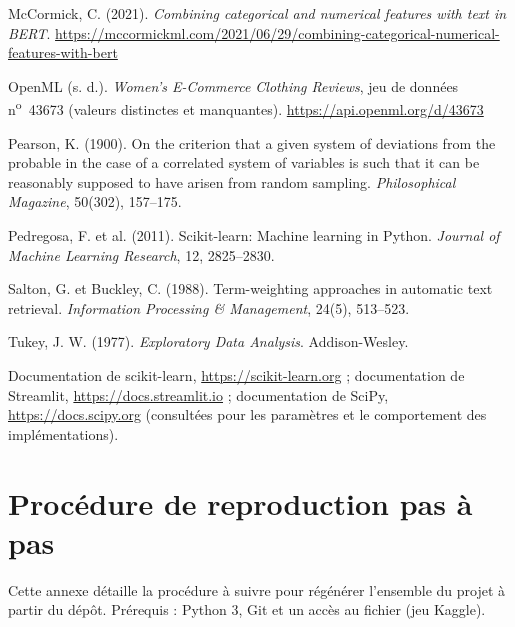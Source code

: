 \documentclass[11pt,a4paper]{report}
\makeatletter
\numberwithin{equation}{chapter}
\DeclareRobustCommand{\code}[1]{{\ttfamily\fontsize{\strip@pt\dimexpr\f@size pt*9/10\relax}{\f@baselineskip}\selectfont\detokenize{#1}}}
\makeatother
\begin{document}
\begin{list}{}{\setlength{\leftmargin}{1.5em}\setlength{\itemindent}{-1.5em}\setlength{\itemsep}{4pt}\setlength{\parsep}{0pt}\setlength{\topsep}{0pt}}
\item McCormick, C. (2021). \textit{Combining categorical and numerical features with text in BERT}. \url{https://mccormickml.com/2021/06/29/combining-categorical-numerical-features-with-bert}
\item OpenML (s. d.). \textit{Women's E-Commerce Clothing Reviews}, jeu de données n\textsuperscript{o}~43673 (valeurs distinctes et manquantes). \url{https://api.openml.org/d/43673}
\item Pearson, K. (1900). On the criterion that a given system of deviations from the probable in the case of a correlated system of variables is such that it can be reasonably supposed to have arisen from random sampling. \textit{Philosophical Magazine}, 50(302), 157--175.
\item Pedregosa, F. et al. (2011). Scikit-learn: Machine learning in Python. \textit{Journal of Machine Learning Research}, 12, 2825--2830.
\item Salton, G. et Buckley, C. (1988). Term-weighting approaches in automatic text retrieval. \textit{Information Processing \& Management}, 24(5), 513--523.
\item Tukey, J. W. (1977). \textit{Exploratory Data Analysis}. Addison-Wesley.
\item Documentation de scikit-learn, \url{https://scikit-learn.org} ; documentation de Streamlit, \url{https://docs.streamlit.io} ; documentation de SciPy, \url{https://docs.scipy.org} (consultées pour les paramètres et le comportement des implémentations).
\end{list}
\endgroup
\appendix
\chapter{Procédure de reproduction pas à pas}\label{app:repro}
Cette annexe détaille la procédure à suivre pour régénérer l'ensemble du projet à partir du dépôt. Prérequis : Python 3, Git et un accès au fichier \code{reviews.csv} (jeu Kaggle).
\end{document}
